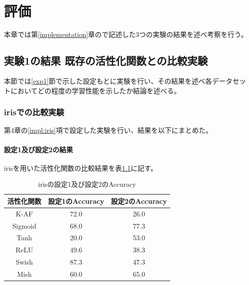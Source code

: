 \chapter{評価}
\label{evaluation}

本章では第\ref{implementation}章ので記述した3つの実験の結果を述べ考察を行う。

\section{実験1の結果 既存の活性化関数との比較実験}
\label{evo1}
本節では\ref{exp1}節で示した設定もとに実験を行い、その結果を述べ各データセットにおいてどの程度の学習性能を示したか結論を述べる。

\subsection{irisでの比較実験}
\label{ev:iris}

第4章の\ref{impl:iris}項で設定した実験を行い、結果を以下にまとめた。
\subsubsection{設定1及び設定2の結果}

irisを用いた活性化関数の比較結果を表\ref{result:iristable}に記す。

\begin{table}[htbp]
    \begin{center}
        \caption{irisの設定1及び設定2のAccuracy}
        \label{result:iristable}
        \vspace{2mm} 
        \begin{tabular}{|c|c|c|}
            \hline
            活性化関数  & 設定1のAccuracy &  設定2のAccuracy \\
            \hline
            K-AF            & 72.0 & 26.0 \\
            \hline
            Sigmoid            & 68.0 & 77.3\\
            \hline
            Tanh            & 20.0 & 53.0\\
            \hline
            ReLU        &  49.6 &  38.3\\
            \hline
            Swish           & 87.3 & 47.3 \\
            \hline
            Mish           & 60.0 & 65.0 \\
            \hline
    
        \end{tabular}
    \end{center}
\end{table}


